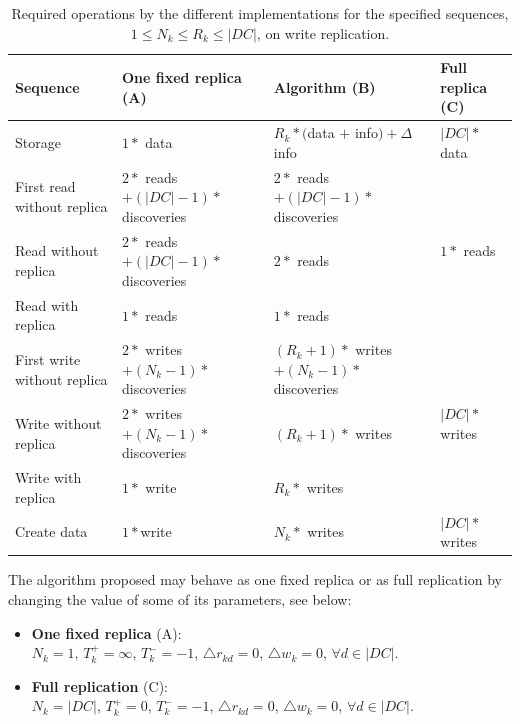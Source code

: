 \documentclass{acm_proc_article-sp}
\begin{document}
\begin{table}
	\centering
	\begin{tabular}{|l||l|l|l|}
		\hline
		{\bf Sequence} & {\bf One fixed replica {\small (A)}} &  {\bf Algorithm {\small (B)}} & {\bf Full replica {\small (C)}} \\
		\hline
		\hline
		Storage                              & $1 * $ data
												  & $R_{k} * ($data $ + $ info$) + \Delta$info
												  & $|DC| * $ data \\
		\hline

		\hline
		First read without replica   & $2 * $ reads $ + (|DC| - 1) * $ discoveries 
								                  & $2 * $ reads $ + (|DC| - 1) * $ discoveries 
								                  & \multirow{3}{*}{$1 * $ reads} \\
	    \cline{1-3}
		Read without replica          & $2 * $ reads $ + (|DC| - 1) * $ discoveries
									              & $2 * $ reads 
				                                  & \\
		\cline{1-3}
		Read with replica               & $1 * $ reads
												  & $1 * $ reads
												  & \\
		\hline

		\hline
		First write without replica   & $2 * $ writes $ + (N_{k} - 1) * $ discoveries
												   & $(R_{k} + 1) * $ writes $ + (N_{k} - 1) * $ discoveries
												   & \multirow{3}{*}{$|DC| * $ writes} \\
		\cline{1-3}
		Write without replica           & $2 * $ writes $ + (N_{k} - 1) * $ discoveries
												   &  $(R_{k} + 1) * $ writes
												   & \\
		\cline{1-3}
		Write with replica                & $1 * $ write
												   & $R_{k} * $ writes
												   & \\
		\hline
		
		\hline
		Create data                         & $1 * $write
												   & $N_{k} * $ writes
												   & $|DC| * $ writes \\
		\hline
	\end{tabular}

	\caption{Required operations by the different implementations for the specified sequences, $1 \le N_{k} \le R_{k} \le |DC|$, on write replication.}
	\label{tb:implementations_sds}
\end{table}

The algorithm proposed may behave as one fixed replica or as full replication by changing the value of some of its parameters, see below:
\begin{itemize}
	\item {\bf One fixed replica} (A):\\
	$N_{k} = 1$, $T^{+}_{k} = \infty$, $T^{-}_{k} = -1$, $\bigtriangleup r_{kd} = 0$, $\bigtriangleup w_{k} = 0$, $\forall d \in |DC|$.

	\item {\bf Full replication} (C):\\
	$N_{k} = |DC|$, $T^{+}_{k} = 0$, $T^{-}_{k} = -1$, $\bigtriangleup r_{kd} = 0$, $\bigtriangleup w_{k} = 0$, $\forall d \in |DC|$.
\end{itemize}
\end{document}
